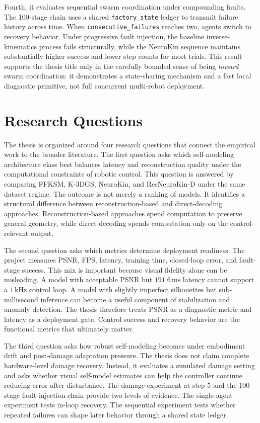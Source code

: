 \documentclass[12pt,a4paper,oneside]{report}
\begin{document}
Fourth, it evaluates sequential swarm coordination under compounding faults. The 100-stage chain uses a shared \texttt{factory\_state} ledger to transmit failure history across time. When \texttt{consecutive\_failures} reaches two, agents switch to recovery behavior. Under progressive fault injection, the baseline inverse-kinematics process fails structurally, while the NeuroKin sequence maintains substantially higher success and lower step counts for most trials. This result supports the thesis title only in the carefully bounded sense of being \emph{toward} swarm coordination: it demonstrates a state-sharing mechanism and a fast local diagnostic primitive, not full concurrent multi-robot deployment.

\section{Research Questions}

The thesis is organized around four research questions that connect the empirical work to the broader literature. The first question asks which self-modeling architecture class best balances latency and reconstruction quality under the computational constraints of robotic control. This question is answered by comparing FFKSM, K-3DGS, NeuroKin, and ResNeuroKin-D under the same dataset regime. The outcome is not merely a ranking of models. It identifies a structural difference between reconstruction-based and direct-decoding approaches. Reconstruction-based approaches spend computation to preserve general geometry, while direct decoding spends computation only on the control-relevant output.

The second question asks which metrics determine deployment readiness. The project measures PSNR, FPS, latency, training time, closed-loop error, and fault-stage success. This mix is important because visual fidelity alone can be misleading. A model with acceptable PSNR but $191.6\,\mathrm{ms}$ latency cannot support a $1\,\mathrm{kHz}$ control loop. A model with slightly imperfect silhouettes but sub-millisecond inference can become a useful component of stabilization and anomaly detection. The thesis therefore treats PSNR as a diagnostic metric and latency as a deployment gate. Control success and recovery behavior are the functional metrics that ultimately matter.

The third question asks how robust self-modeling becomes under embodiment drift and post-damage adaptation pressure. The thesis does not claim complete hardware-level damage recovery. Instead, it evaluates a simulated damage setting and asks whether visual self-model estimates can help the controller continue reducing error after disturbance. The damage experiment at step $5$ and the 100-stage fault-injection chain provide two levels of evidence. The single-agent experiment tests in-loop recovery. The sequential experiment tests whether repeated failures can shape later behavior through a shared state ledger.
\end{document}
